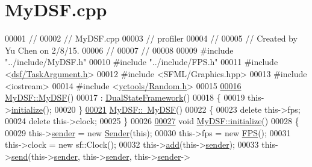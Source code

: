 \hypertarget{_my_d_s_f_8cpp_source}{}\section{My\+D\+S\+F.\+cpp}
\label{_my_d_s_f_8cpp_source}

\begin{DoxyCode}
00001 \textcolor{comment}{//}
00002 \textcolor{comment}{//  MyDSF.cpp}
00003 \textcolor{comment}{//  profiler}
00004 \textcolor{comment}{//}
00005 \textcolor{comment}{//  Created by Yu Chen on 2/8/15.}
00006 \textcolor{comment}{//}
00007 \textcolor{comment}{//}
00008 
00009 \textcolor{preprocessor}{#include "../include/MyDSF.h"}
00010 \textcolor{preprocessor}{#include "../include/FPS.h"}
00011 \textcolor{preprocessor}{#include <\hyperlink{_task_argument_8h}{dsf/TaskArgument.h}>}
00012 \textcolor{preprocessor}{#include <SFML/Graphics.hpp>}
00013 \textcolor{preprocessor}{#include <iostream>}
00014 \textcolor{preprocessor}{#include <\hyperlink{_random_8h}{yctools/Random.h}>}
00015 
\hypertarget{_my_d_s_f_8cpp_source_l00016}{}\hyperlink{class_my_d_s_f_a7a674c56832e56804ef3f529b5ea8873}{00016} \hyperlink{class_my_d_s_f_a7a674c56832e56804ef3f529b5ea8873}{MyDSF::MyDSF}()
00017 : \hyperlink{namespacedsf_a68ac3b6a0526bfa7f6a412918afb1841}{DualStateFramework}()
00018 \{
00019     this->\hyperlink{class_my_d_s_f_aadd27ab33c6958abe2ed4c507e6e5dae}{initialize}();
00020 \}
\hypertarget{_my_d_s_f_8cpp_source_l00021}{}\hyperlink{class_my_d_s_f_a045f1ee7aab3f5259e93da63646d2265}{00021} \hyperlink{class_my_d_s_f_a045f1ee7aab3f5259e93da63646d2265}{MyDSF::~MyDSF}()
00022 \{
00023     \textcolor{keyword}{delete} this->fps;
00024     \textcolor{keyword}{delete} this->clock;
00025 \}
00026 
\hypertarget{_my_d_s_f_8cpp_source_l00027}{}\hyperlink{class_my_d_s_f_aadd27ab33c6958abe2ed4c507e6e5dae}{00027} \textcolor{keywordtype}{void} \hyperlink{class_my_d_s_f_aadd27ab33c6958abe2ed4c507e6e5dae}{MyDSF::initialize}()
00028 \{
00029     this->\hyperlink{class_my_d_s_f_a0c9939346f14a4e8542a22bc5e17bd7a}{sender} = \textcolor{keyword}{new} \hyperlink{class_my_d_s_f_1_1_sender}{Sender}(\textcolor{keyword}{this});
00030     this->fps = \textcolor{keyword}{new} \hyperlink{class_f_p_s}{FPS}();
00031     this->clock = \textcolor{keyword}{new} sf::Clock();
00032     this->\hyperlink{classdsf_1_1_dual_state_framework_a2ce40c8e165a8ed8fd6cb6cb30ae985b}{add}(this->\hyperlink{class_my_d_s_f_a0c9939346f14a4e8542a22bc5e17bd7a}{sender});
00033     this->\hyperlink{classdsf_1_1_dual_state_framework_a3063d7f0ce537eb44dc2bdcec816a36b}{send}(this->\hyperlink{class_my_d_s_f_a0c9939346f14a4e8542a22bc5e17bd7a}{sender}, this->\hyperlink{class_my_d_s_f_a0c9939346f14a4e8542a22bc5e17bd7a}{sender}, this->\hyperlink{class_my_d_s_f_a0c9939346f14a4e8542a22bc5e17bd7a}{sender}->

\end{DoxyCode}
